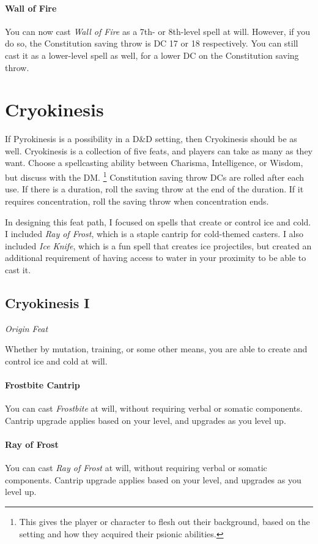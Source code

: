 \documentclass[twocolumn]{dndbook}
\begin{document}
\paragraph*{Wall of Fire} You can now cast \emph{Wall of Fire} as a 7th- or 8th-level spell at will.
However, if you do so, the Constitution saving throw is DC 17 or 18 respectively.
You can still cast it as a lower-level spell as well, for a lower DC on the Constitution saving throw.




\section{Cryokinesis}

If Pyrokinesis is a possibility in a D\&D setting, then Cryokinesis should be as well.
Cryokinesis is a collection of five feats, and players can take as many as they want.
Choose a spellcasting ability between Charisma, Intelligence, or Wisdom, but discuss with the DM.
\footnote{This gives the player or character to flesh out their background, based on the setting and how they acquired their psionic abilities.}
Constitution saving throw DCs are rolled after each use.
If there is a duration, roll the saving throw at the end of the duration.
If it requires concentration, roll the saving throw when concentration ends.\par

In designing this feat path, I focused on spells that create or control ice and cold.
I included \emph{Ray of Frost}, which is a staple cantrip for cold-themed casters.
I also included \emph{Ice Knife}, which is a fun spell that creates ice projectiles,
but created an additional requirement of having access to water in your proximity to be able to cast it.


\subsection{Cryokinesis I}
{\emph{Origin Feat}}\par
Whether by mutation, training, or some other means, you are able to create and control ice and cold at will.
\paragraph*{Frostbite Cantrip} You can cast \emph{Frostbite} at will,
without requiring verbal or somatic components. Cantrip upgrade applies based on your level, and upgrades as you level up.
\paragraph*{Ray of Frost} You can cast \emph{Ray of Frost} at will,
without requiring verbal or somatic components. Cantrip upgrade applies based on your level, and upgrades as you level up.
\end{document}
